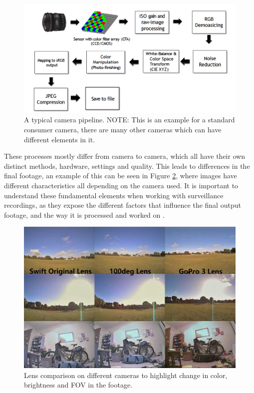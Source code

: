 \begin{figure}[H]
    \centering
    \includegraphics[width=1\linewidth]{figures/images/How_camera_works_pipeline.png}
    \caption{A typical camera pipeline.
    NOTE: This is an example for a standard consumer camera, there are many other cameras which can have different elements in it. }
    \label{fig:camera_pipeline}
\end{figure}
\noindent
These processes mostly differ from camera to camera, which all have their own distinct methods, hardware, settings and quality. This leads to differences in the final footage, an example of this can be seen in Figure \ref{fig:lens_comparison}, where images have different characteristics all depending on the camera used. It is important to understand these fundamental elements when working with surveillance recordings, as they expose the different factors that influence the final output footage, and the way it is processed and worked on \cite{korene_imatest2022_cv_iq}.
\begin{figure}[H]
    \centering
    \includegraphics[width=0.7\linewidth]{figures/images/runcam-swift-lens-comparison.jpg}
    \caption{Lens comparison on different cameras to highlight change in color, brightness and \ac{FOV} in the footage.}
    \label{fig:lens_comparison}
\end{figure}
